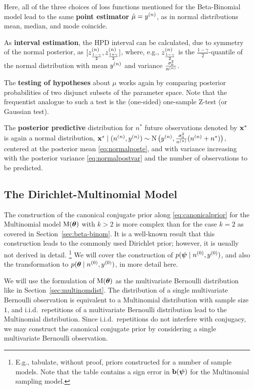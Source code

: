 Here, all of the three choices of loss functions mentioned for the Beta-Binomial model
lead to the same \textbf{point estimator} $\hat{\mu} = y^{(n)}$,
as in normal distributions mean, median, and mode coincide.

As \textbf{interval estimation}, the HPD interval can be calculated, due to symmetry of the normal posterior,
as $[z^{(n)}_\frac{1-\gamma}{2}, z^{(n)}_\frac{1+\gamma}{2}]$, where, e.g.,
$z^{(n)}_\frac{1-\gamma}{2}$ is the $\frac{1-\gamma}{2}$-quantile of the normal distribution with mean $y^{(n)}$ and variance $\frac{\sigma_0^2}{n^{(n)}}$.

The \textbf{testing of hypotheses} about $\mu$ works again by comparing posterior probabilities of two disjunct subsets of the parameter space.
Note that the frequentist analogue to such a test is the (one-sided) one-sample Z-test (or Gaussian test).

The \textbf{posterior predictive} distribution for $n^*$ future observations denoted by $\mathbf{x}^*$ is again a normal distribution,
$\mathbf{x}^*\mid(n^{(n)},y^{(n)}) \sim \operatorname{N}\big(y^{(n)}, \frac{\sigma_0^2}{n^{(n)}}(n^{(n)} + n^*)\big)$,
centered at the posterior mean \eqref{eq:normalposte},
and with variance increasing with the posterior variance \eqref{eq:normalpostvar}
and the number of observations to be predicted.


\subsection{The Dirichlet-Multinomial Model}
\label{sec:diri-multi}

The construction of the canonical conjugate prior along \eqref{eq:canonicalprior}
for the Multinomial model $\operatorname{M}(\boldsymbol{\theta})$ with $k>2$ is more complex than for the case $k=2$
as covered in Section~\ref{sec:beta-binom}.
It is a well-known result that this construction leads to the commonly used Dirichlet prior;
however, it is usually not derived in detail.%
\footnote{E.g., \cite[Table~1]{2005:quaeghebeurcooman} tabulate, without proof,
priors constructed for a number of sample models.
Note that the table contains a sign error in $\mathbf{b}(\boldsymbol{\psi})$ for the Multinomial sampling model.}
We will cover the construction of $p(\boldsymbol{\psi}\mid n^{(0)}, y^{(0)})$,
and also the transformation to $p(\boldsymbol{\theta}\mid n^{(0)}, y^{(0)})$,
in more detail here.

We will use the formulation of $\operatorname{M}(\boldsymbol{\theta})$ as the multivariate Bernoulli distribution
like in Section~\ref{sec:multinomdist}.
The distribution of a single multivariate Bernoulli observation is equivalent to a Multinomial distribution with sample size $1$,
and i.i.d.\ repetitions of a multivariate Bernoulli distribution lead to the Multinomial distribution.
Since i.i.d.\ repetitions do not interfere with conjugacy,
we may construct the canonical conjugate prior by considering a single multivariate Bernoulli observation.

